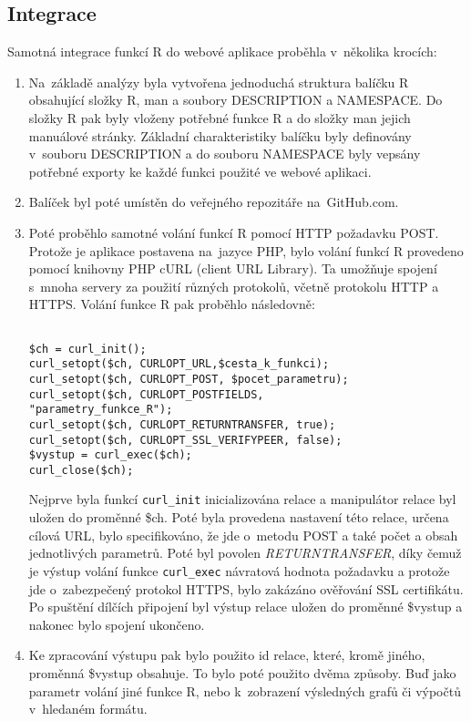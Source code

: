 \documentclass[thesis=B,czech]{FITthesis}[2012/06/26]
\begin{document}
\subsection{Integrace} 
Samotná integrace funkcí R do webové aplikace proběhla v~několika krocích:

\begin{enumerate}
\item Na~základě analýzy byla vytvořena jednoduchá struktura balíčku R obsahující složky R, man a soubory DESCRIPTION a NAMESPACE. Do složky R pak byly vloženy potřebné funkce R a do složky man jejich manuálové stránky. Základní charakteristiky balíčku byly definovány v~souboru DESCRIPTION a do souboru NAMESPACE byly vepsány potřebné exporty ke každé funkci použité ve webové aplikaci.

\item Balíček byl poté umístěn do veřejného repozitáře na~GitHub.com.

\item Poté proběhlo samotné volání funkcí R pomocí HTTP požadavku POST. Protože je aplikace postavena na~jazyce PHP, bylo volání funkcí R provedeno pomocí knihovny PHP cURL (client URL Library). Ta umožňuje spojení s~mnoha servery za použití různých protokolů, včetně protokolu HTTP a HTTPS. Volání funkce R pak proběhlo následovně:

\begin{verbatim}

$ch = curl_init();
curl_setopt($ch, CURLOPT_URL,$cesta_k_funkci);
curl_setopt($ch, CURLOPT_POST, $pocet_parametru);
curl_setopt($ch, CURLOPT_POSTFIELDS,
"parametry_funkce_R");
curl_setopt($ch, CURLOPT_RETURNTRANSFER, true);
curl_setopt($ch, CURLOPT_SSL_VERIFYPEER, false); 
$vystup = curl_exec($ch);
curl_close($ch); 

\end{verbatim}
Nejprve byla funkcí \texttt{curl\_init} inicializována relace a manipulátor relace byl uložen do proměnné \$ch. Poté byla provedena nastavení této relace, určena cílová URL, bylo specifikováno, že jde o~metodu POST a také počet a obsah jednotlivých parametrů. Poté byl povolen \textit{RETURNTRANSFER}, díky čemuž je výstup volání funkce \texttt{curl\_exec} návratová hodnota požadavku a protože jde o~zabezpečený protokol HTTPS, bylo zakázáno ověřování SSL certifikátu. Po spuštění dílčích připojení byl výstup relace uložen do proměnné \$vystup a nakonec bylo spojení ukončeno.  

\item Ke zpracování výstupu pak bylo použito id relace, které, kromě jiného, proměnná \$vystup obsahuje. To bylo poté použito dvěma způsoby. Buď jako parametr volání jiné funkce R, nebo k~zobrazení výsledných grafů či výpočtů v~hledaném formátu. 
\end{enumerate}
\end{document}
